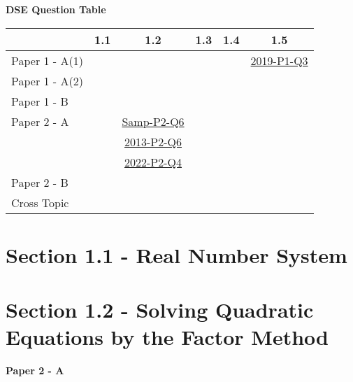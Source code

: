 \documentclass[12pt, a4paper]{article}
\begin{document}
\begin{absolutelynopagebreak}
\begin{center}
\textbf{DSE Question Table}
\end{center}
\begin{center}
\begin{tabular}{|l|c|c|c|c|c|}
\hline
        & 1.1 & 1.2 & 1.3 & 1.4 & 1.5 \\\hline
\hline
Paper 1 - A(1)&  &  &  &  & \hyperref[DSE2019-CoreP1-Q03]{2019-P1-Q3} \\
\hline
Paper 1 - A(2)&  &  &  &  &  \\
\hline
Paper 1 - B&  &  &  &  &  \\
\hline
\hline
Paper 2 - A&  & \hyperref[DSE2012S-CoreP2-Q06]{Samp-P2-Q6} &  &  &  \\
&  & \hyperref[DSE2013-CoreP2-Q06]{2013-P2-Q6} &  &  &  \\
&  & \hyperref[DSE2022-CoreP2-Q04]{2022-P2-Q4} &  &  &  \\
\hline
Paper 2 - B&  &  &  &  &  \\
\hline
\hline
Cross Topic&  &  &  &  &  \\
\hline
\end{tabular}
\end{center}
\end{absolutelynopagebreak}




\section*{Section 1.1 - Real Number System}\label{section:4-1-1}





\section*{Section 1.2 - Solving Quadratic Equations by the Factor Method}\label{section:4-1-2}

\textbf{Paper 2 - A}
\begin{enumx}[label=\arabic*.,start=1]
\item {}\label{DSE2012S-CoreP2-Q06} 
\item {}\label{DSE2013-CoreP2-Q06} 
\item {}\label{DSE2022-CoreP2-Q04} 
\end{enumx}
\end{document}
